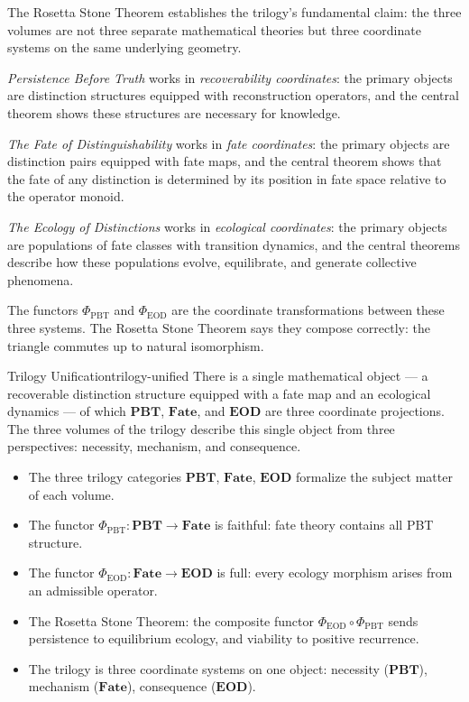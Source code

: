 \documentclass[12pt,twoside,openright]{book}
\newcommand{\catFate}{\mathbf{Fate}}
\providecommand{\catFate}{\mathbf{Fate}}
\newenvironment{appsummary}{%
  \begin{tcolorbox}[colback=DistBlue!5,colframe=DistBlue,
    title={\faBookOpen\enspace Appendix Summary},
    fonttitle=\sffamily\bfseries\color{white},
    attach boxed title to top left={yshift=-2mm,xshift=4mm},
    boxed title style={colback=DistBlue,rounded corners}]
  \begin{itemize}[nosep,leftmargin=*]}{%
  \end{itemize}\end{tcolorbox}}
\providecommand{\catPBT}{\mathbf{PBT}}
\providecommand{\catEOD}{\mathbf{EOD}}
\providecommand{\functorPBT}{\Phi_{\mathrm{PBT}}}
\providecommand{\functorEOD}{\Phi_{\mathrm{EOD}}}
\begin{document}
The Rosetta Stone Theorem establishes the trilogy's
fundamental claim: the three volumes are not three separate
mathematical theories but three coordinate systems on the
same underlying geometry. 

\textit{Persistence Before Truth} works in \emph{recoverability
coordinates}: the primary objects are distinction structures
equipped with reconstruction operators, and the central
theorem shows these structures are necessary for knowledge.

\textit{The Fate of Distinguishability} works in \emph{fate
coordinates}: the primary objects are distinction pairs
equipped with fate maps, and the central theorem shows
that the fate of any distinction is determined by its
position in fate space relative to the operator monoid.

\textit{The Ecology of Distinctions} works in \emph{ecological
coordinates}: the primary objects are populations of fate
classes with transition dynamics, and the central theorems
describe how these populations evolve, equilibrate, and
generate collective phenomena.

The functors $\functorPBT$ and $\functorEOD$ are the
coordinate transformations between these three systems.
The Rosetta Stone Theorem says they compose correctly:
the triangle commutes up to natural isomorphism.

\begin{metatheorem}{Trilogy Unification}{trilogy-unified}
There is a single mathematical object --- a recoverable
distinction structure equipped with a fate map and an
ecological dynamics --- of which $\catPBT$, $\catFate$,
and $\catEOD$ are three coordinate projections. The
three volumes of the trilogy describe this single object
from three perspectives: necessity, mechanism, and
consequence.
\end{metatheorem}

\begin{appsummary}
\item The three trilogy categories $\catPBT$, $\catFate$,
  $\catEOD$ formalize the subject matter of each volume.
\item The functor $\functorPBT:\catPBT\to\catFate$ is
  faithful: fate theory contains all PBT structure.
\item The functor $\functorEOD:\catFate\to\catEOD$ is full:
  every ecology morphism arises from an admissible operator.
\item The Rosetta Stone Theorem: the composite functor
  $\functorEOD\circ\functorPBT$ sends persistence to
  equilibrium ecology, and viability to positive recurrence.
\item The trilogy is three coordinate systems on one object:
  necessity ($\catPBT$), mechanism ($\catFate$),
  consequence ($\catEOD$).
\end{appsummary}
\end{document}
